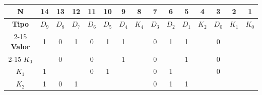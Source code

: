 \begin{center}
\begin{tabular}{c|cccccccccccccc}
\rowcolor[HTML]{FFFFC7} 
\cellcolor[HTML]{FCFF2F}\textbf{N}     & 14                        & 13                        & 12                        & 11                        & 10                        & 9                         & 8                        & 7                         & 6                         & 5                         & 4                        & 3                         & 2                        & 1                        \\ \hline
\rowcolor[HTML]{CBCEFB} 
\cellcolor[HTML]{9698ED}\textbf{Tipo}  & $D_9$                     & $D_8$                     & $D_7$                     & $D_6$                     & $D_5$                     & $D_4$                     & $K_4$                    & $D_3$                     & $D_2$                    & $D_1$                     & $K_2$                    & $D_0$                     & $K_1$                    & $K_0$                    \\ \cline{2-15} 
\rowcolor[HTML]{FFCCC9} 
\cellcolor[HTML]{FD6864}\textbf{Valor} & 1                         & 0                         & 1                         & 0                         & 1                         & 1                         &                          & 0                         & 1                         & 1                         &                          & 0                         &                          &                          \\ \cline{2-15} 
\cellcolor[HTML]{9AFF99}$K_0$          &                           & \cellcolor[HTML]{96FFFB}0 &                           & \cellcolor[HTML]{96FFFB}0 &                           & \cellcolor[HTML]{96FFFB}1 &                          & \cellcolor[HTML]{96FFFB}0 &                           & \cellcolor[HTML]{96FFFB}1 &                          & \cellcolor[HTML]{96FFFB}0 &                          & \cellcolor[HTML]{96FFFB} \\
\cellcolor[HTML]{9AFF99}$K_1$          & \cellcolor[HTML]{96FFFB}1 &                           &                           & \cellcolor[HTML]{96FFFB}0 & \cellcolor[HTML]{96FFFB}1 &                           &                          & \cellcolor[HTML]{96FFFB}0 & \cellcolor[HTML]{96FFFB}1 &                           &                          & \cellcolor[HTML]{96FFFB}0 & \cellcolor[HTML]{96FFFB} &                          \\
\cellcolor[HTML]{9AFF99}$K_2$          & \cellcolor[HTML]{96FFFB}1 & \cellcolor[HTML]{96FFFB}0 & \cellcolor[HTML]{96FFFB}1 &                           &                           &                           &                          & \cellcolor[HTML]{96FFFB}0 & \cellcolor[HTML]{96FFFB}1 & \cellcolor[HTML]{96FFFB}1 & \cellcolor[HTML]{96FFFB} &                           &                          &                          \\

\end{tabular}
\end{center}
